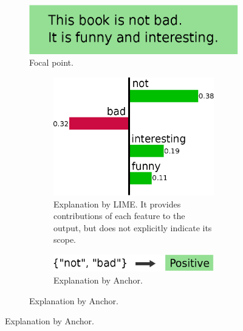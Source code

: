 \documentclass[11pt]{article}
\begin{document}
\begin{figure}[tbp]
  \def\scale{0.38}
  \centering
  \begin{subfigure}[t]{0.55\textwidth}
    \centering
    \includegraphics[scale=\scale]{example-instance}
    \caption{Focal point.}\label{fig:example-instance}
    \vspace{0.5cm}
  \end{subfigure}
  \begin{subfigure}[t]{0.45\textwidth}
    \begin{subfigure}[t]{\textwidth}
      \centering
      \includegraphics[scale=\scale]{example-lime}
      \caption{%
        Explanation by LIME\@.
        It provides contributions of each feature to the output,
        but does not explicitly indicate its scope.
      }\label{fig:example-lime}
      \vspace{0.4cm}
    \end{subfigure}
    \begin{subfigure}[t]{\textwidth}
      \centering
      \includegraphics[scale=\scale]{example-anchor}
      \caption{%
        Explanation by Anchor.
}
\end{subfigure}
\end{subfigure}
\end{figure}
\end{document}
